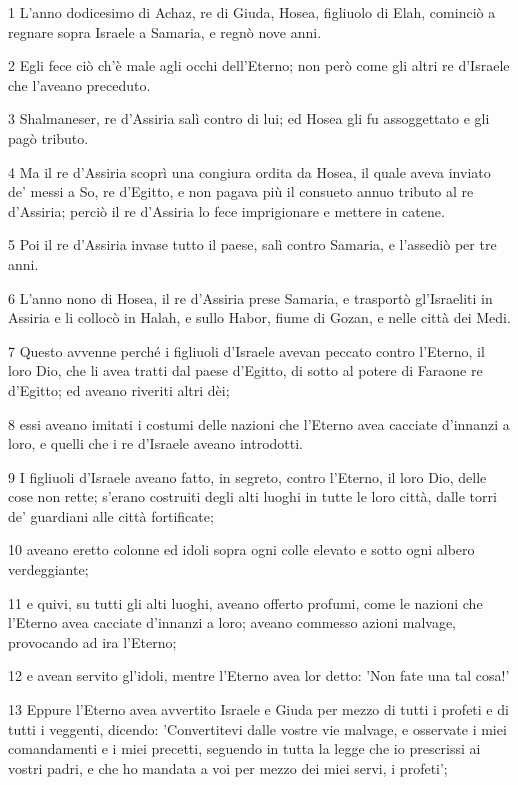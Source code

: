\par 1 L'anno dodicesimo di Achaz, re di Giuda, Hosea, figliuolo di Elah, cominciò a regnare sopra Israele a Samaria, e regnò nove anni.
\par 2 Egli fece ciò ch'è male agli occhi dell'Eterno; non però come gli altri re d'Israele che l'aveano preceduto.
\par 3 Shalmaneser, re d'Assiria salì contro di lui; ed Hosea gli fu assoggettato e gli pagò tributo.
\par 4 Ma il re d'Assiria scoprì una congiura ordita da Hosea, il quale aveva inviato de' messi a So, re d'Egitto, e non pagava più il consueto annuo tributo al re d'Assiria; perciò il re d'Assiria lo fece imprigionare e mettere in catene.
\par 5 Poi il re d'Assiria invase tutto il paese, salì contro Samaria, e l'assediò per tre anni.
\par 6 L'anno nono di Hosea, il re d'Assiria prese Samaria, e trasportò gl'Israeliti in Assiria e li collocò in Halah, e sullo Habor, fiume di Gozan, e nelle città dei Medi.
\par 7 Questo avvenne perché i figliuoli d'Israele avevan peccato contro l'Eterno, il loro Dio, che li avea tratti dal paese d'Egitto, di sotto al potere di Faraone re d'Egitto; ed aveano riveriti altri dèi;
\par 8 essi aveano imitati i costumi delle nazioni che l'Eterno avea cacciate d'innanzi a loro, e quelli che i re d'Israele aveano introdotti.
\par 9 I figliuoli d'Israele aveano fatto, in segreto, contro l'Eterno, il loro Dio, delle cose non rette; s'erano costruiti degli alti luoghi in tutte le loro città, dalle torri de' guardiani alle città fortificate;
\par 10 aveano eretto colonne ed idoli sopra ogni colle elevato e sotto ogni albero verdeggiante;
\par 11 e quivi, su tutti gli alti luoghi, aveano offerto profumi, come le nazioni che l'Eterno avea cacciate d'innanzi a loro; aveano commesso azioni malvage, provocando ad ira l'Eterno;
\par 12 e avean servito gl'idoli, mentre l'Eterno avea lor detto: 'Non fate una tal cosa!'
\par 13 Eppure l'Eterno avea avvertito Israele e Giuda per mezzo di tutti i profeti e di tutti i veggenti, dicendo: 'Convertitevi dalle vostre vie malvage, e osservate i miei comandamenti e i miei precetti, seguendo in tutta la legge che io prescrissi ai vostri padri, e che ho mandata a voi per mezzo dei miei servi, i profeti';

